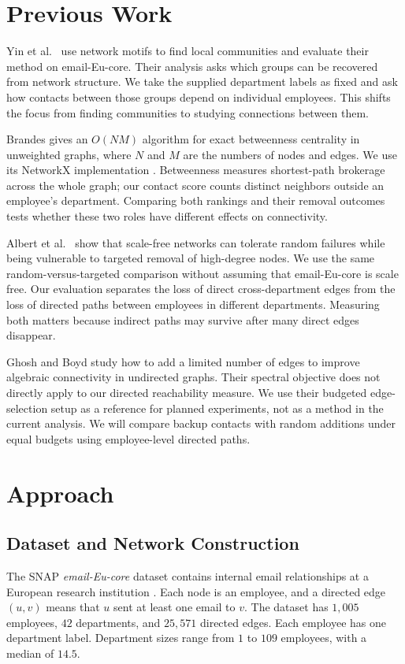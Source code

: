 \documentclass[conference]{IEEEtran}
\begin{document}
\section{Previous Work}
Yin et al.\ \cite{yin2017local} use network motifs to find local communities and evaluate their method on email-Eu-core. Their analysis asks which groups can be recovered from network structure. We take the supplied department labels as fixed and ask how contacts between those groups depend on individual employees. This shifts the focus from finding communities to studying connections between them.

Brandes \cite{brandes2001faster} gives an $O(NM)$ algorithm for exact betweenness centrality in unweighted graphs, where $N$ and $M$ are the numbers of nodes and edges. We use its NetworkX implementation \cite{networkx-betweenness}. Betweenness measures shortest-path brokerage across the whole graph; our contact score counts distinct neighbors outside an employee's department. Comparing both rankings and their removal outcomes tests whether these two roles have different effects on connectivity.

Albert et al.\ \cite{albert2000error} show that scale-free networks can tolerate random failures while being vulnerable to targeted removal of high-degree nodes. We use the same random-versus-targeted comparison without assuming that email-Eu-core is scale free. Our evaluation separates the loss of direct cross-department edges from the loss of directed paths between employees in different departments. Measuring both matters because indirect paths may survive after many direct edges disappear.

Ghosh and Boyd \cite{ghosh2006growing} study how to add a limited number of edges to improve algebraic connectivity in undirected graphs. Their spectral objective does not directly apply to our directed reachability measure. We use their budgeted edge-selection setup as a reference for planned experiments, not as a method in the current analysis. We will compare backup contacts with random additions under equal budgets using employee-level directed paths.

\section{Approach}

\subsection{Dataset and Network Construction}
The SNAP \textit{email-Eu-core} dataset contains internal email relationships at a European research institution \cite{snap-email}. Each node is an employee, and a directed edge $(u,v)$ means that $u$ sent at least one email to $v$. The dataset has $1,005$ employees, $42$ departments, and $25,571$ directed edges. Each employee has one department label. Department sizes range from $1$ to $109$ employees, with a median of $14.5$.
\end{document}
